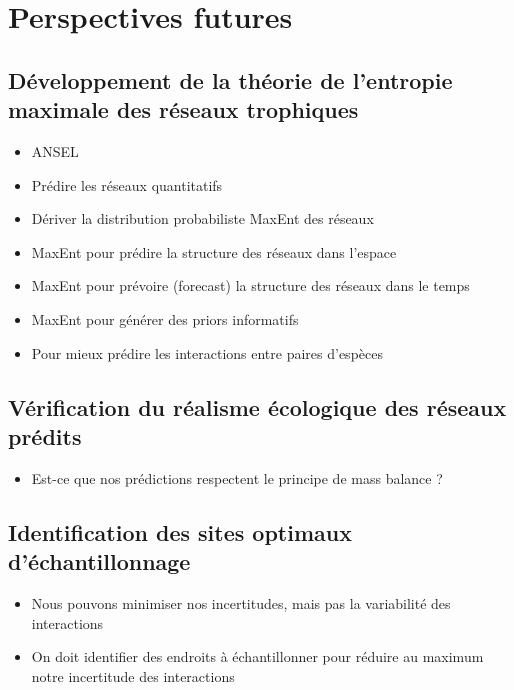 \section{Perspectives futures}

\subsection{Développement de la théorie de l'entropie maximale des réseaux trophiques} 

\begin{itemize}
    \item ANSEL 
    \item Prédire les réseaux quantitatifs
    \item Dériver la distribution probabiliste MaxEnt des réseaux
    \item MaxEnt pour prédire la structure des réseaux dans l'espace
    \item MaxEnt pour prévoire (forecast) la structure des réseaux dans le temps
    \item MaxEnt pour générer des priors informatifs 
    \item Pour mieux prédire les interactions entre paires d'espèces
\end{itemize}


\subsection{Vérification du réalisme écologique des réseaux prédits} 

\begin{itemize}
    \item Est-ce que nos prédictions respectent le principe de mass balance ?
\end{itemize}


\subsection{Identification des sites optimaux d'échantillonnage} 

\begin{itemize}
    \item Nous pouvons minimiser nos incertitudes, mais pas la variabilité des interactions
    \item On doit identifier des endroits à échantillonner pour réduire au maximum notre incertitude des interactions
\end{itemize}



